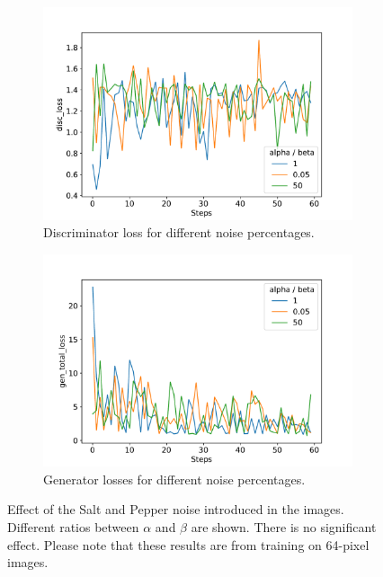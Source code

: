 \begin{figure}
	\centering
	\begin{subfigure}{0.5\linewidth}
		\centering
		\includegraphics[width=\textwidth]{fig/analysis/Plot_noise_factor_disc_loss.pdf}
		\caption{Discriminator loss for different noise percentages.}
		\label{fig:Plot_noise_discloss}
	\end{subfigure}\hfill
	\begin{subfigure}{0.5\linewidth}
		\centering
		\includegraphics[width=\textwidth]{fig/analysis/Plot_noise_factor_gen_total_loss.pdf}
		\caption{Generator losses for different noise percentages.}
		\label{fig:Plot_noise_genloss}
	\end{subfigure}\hfill
	\caption{Effect of the Salt and Pepper noise introduced in the images. Different ratios between $\alpha$ and $\beta$ are shown. There is no significant effect. Please note that these results are from training on 64-pixel images.}
	\label{fig:Plot_noise_loss}
\end{figure}

